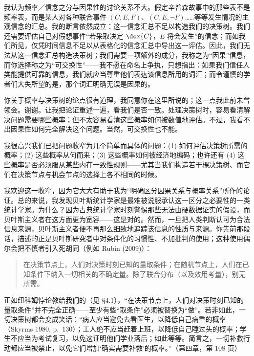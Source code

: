 我认为频率／信念之分与因果性的讨论关系不大。假定辛普森故事中的那些表不是频率表，而是某人对各种联合事件 $(C,E,F)$、$(C,E,\neg F)$……等等发生情况的主观信念的汇总。我的断言依然成立：这一信念汇总不足以构造我们的决策树。我们还需要评估自己对假想事件“若采取决定 $\dox{C}$，$E$ 将会发生”的信念；而如我们所见，仅凭时间信息不足以从表格化的信念汇总中导出这一评估。因此，我们无法从这一信念汇总构造决策树；我们需要一项额外的成分，我称之为“因果”信息，而你选择称之为“可交换性”——我不愿在命名上争执，只想指出：如果我们信任人类能提供可靠的信息，我们就应当尊重他们表达该信息所用的词汇；而令谨慎的学者们大失所望的是，那个词汇明确无误是因果的。


你关于概率与决策树的论点很有道理，我同意你在这里所说的；这一点我此前未曾领会。谢谢。让我把论证重述一遍，看我们是否一致。处理决策树时，容易看清解决问题需要哪些概率；但不太容易看清这些概率如何被数值地评估。不过，我看不出因果性如何完全解决这个问题。当然，可交换性也不能。


我很高兴我们已把问题收窄为几个简单而具体的问题：(1) 如何评估决策树所需的概率；(2) 这些概率从何而来；(3) 这些概率如何被经济地编码；也许还有 (4) 这些概率是否必须服从某些内在一致性规则——尤其当我们构造若干棵决策树、而它们在决策节点与机会节点的选择上各不相同的时候。

我欢迎这一收窄，因为它大大有助于我为“明确区分因果关系与概率关系”所作的论证。总的来说，我发现贝叶斯统计学家是最难被说服承认这一区分之必要性的一类统计学家。为什么？因为古典统计学家时刻警惕那些无法由硬数据证实的假设，而贝叶斯主义者在这方面更为宽容——这是对的。然而，一旦把人类判断认可为合法信息来源，贝叶斯主义者便不再那么细致地追踪该信息的性质与来源。你先前那段话，描述的正是贝叶斯研究者中对条件化的习惯性、不加批判的使用；这种使用偶尔会把不慎者引入死胡同（例如 Rubin (2009)）：

\begin{quote}\kaishu
在决策节点上，人们对决策时刻已知的量取条件；在随机节点上，人们在已知条件下纳入一切相关的不确定量。除了联合分布（以及效用考量），别无所需。
\end{quote}

正如纽科姆悖论教给我们的（见 \S4.1），“在决策节点上，人们对决策时刻已知的量取条件”并不完全正确——至少有些“取条件”必须被替换为“做”。若非如此，一切决策树都会变成笑话：“病人应当避免去看医生，以降低自己病重的概率（Skyrms 1980, p.~130）；工人绝不应当赶着上班，以降低自己睡过头的概率；学生不应当为考试复习，以免这证明他们学业落后；如此等等。简言之，一切补救行动都应当被禁止，以免它们增加‘确实需要补救’的概率。”（第四章，第 108 页）

